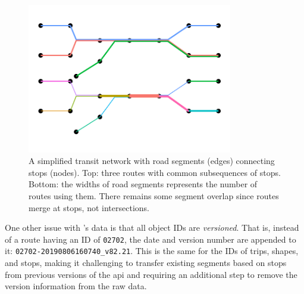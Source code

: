 \begin{knitrout}\small
{}\color{fgcolor}\begin{figure}

{\centering \includegraphics[width=0.8\textwidth]{figure/gtfs_route_network-1} 

}

\caption[A simplified transit network with road segments (edges) connecting stops (nodes)]{A simplified transit network with road segments (edges) connecting stops (nodes). Top: three routes with common subsequences of stops. Bottom: the widths of road segments represents the number of routes using them. There remains some segment overlap since routes merge at stops, not intersections.}\label{fig:gtfs_route_network}
\end{figure}


\end{knitrout}





One other issue with \AT{}'s \GTFS{} data is that all object IDs are \emph{versioned}. That is, instead of a route having an ID of \verb+02702+, the date and version number are appended to it: \verb+02702-20190806160740_v82.21+. This is the same for the IDs of trips, shapes, and stops, making it challenging to transfer existing segments based on stops from previous versions of the \gls{api} and requiring an additional step to remove the version information from the raw data.



